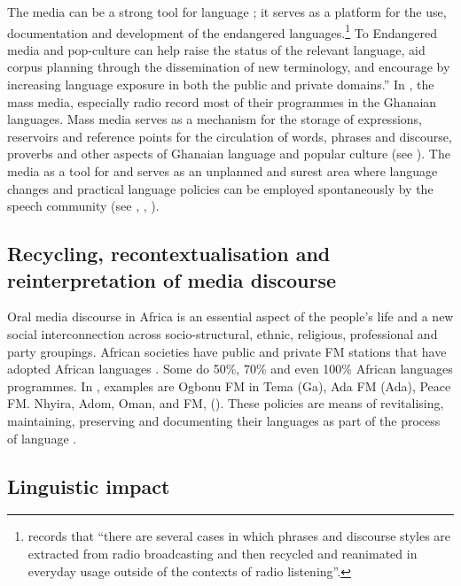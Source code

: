 \documentclass[output=paper,
modfonts
]{langscibook}
\begin{document}
The media can be a strong tool for language ; it serves as a platform for the use, documentation and development of the endangered languages.\footnote{\citet[95]{Spitulnik2001} records that “there are several cases in which phrases and discourse styles are extracted from radio broadcasting and then recycled and reanimated in everyday usage outside of the contexts of radio listening”.} To \citet[447]{Moriarty2011} {\textquotedbl}Endangered media and pop-culture can help raise the status of the relevant language, aid corpus planning through the dissemination of new terminology, and encourage  by increasing language exposure in both the public and private domains.” In , the mass media, especially radio record most of their programmes in the Ghanaian languages. Mass media serves as a mechanism for the storage of expressions, reservoirs and reference points for the circulation of words, phrases and discourse, proverbs and other aspects of Ghanaian language and popular culture (see \citealt[96]{Spitulnik2001}). The media as a tool for  and  serves as an unplanned and surest area where language changes and practical language policies can be employed spontaneously by the speech community (see \citealt{Agyekum2010radio}, \citealt[158]{Derhemi2002b}, \citealt[447]{Moriarty2011}). 

\subsection{Recycling, recontextualisation and reinterpretation of media discourse}

Oral media discourse in Africa is an essential aspect of the people’s life and a new social interconnection across socio-structural, ethnic, religious, professional and party groupings. African societies have public and private FM stations that have adopted African languages . Some do 50\%, 70\% and even 100\% African languages programmes. In , examples are Ogbonu FM in Tema (Ga), Ada FM (Ada), Peace FM. Nhyira, Adom, Oman, and FM, (). These policies are means of revitalising, maintaining, preserving and documenting their languages as part of the process of language . 

\subsection{Linguistic impact}
\end{document}
